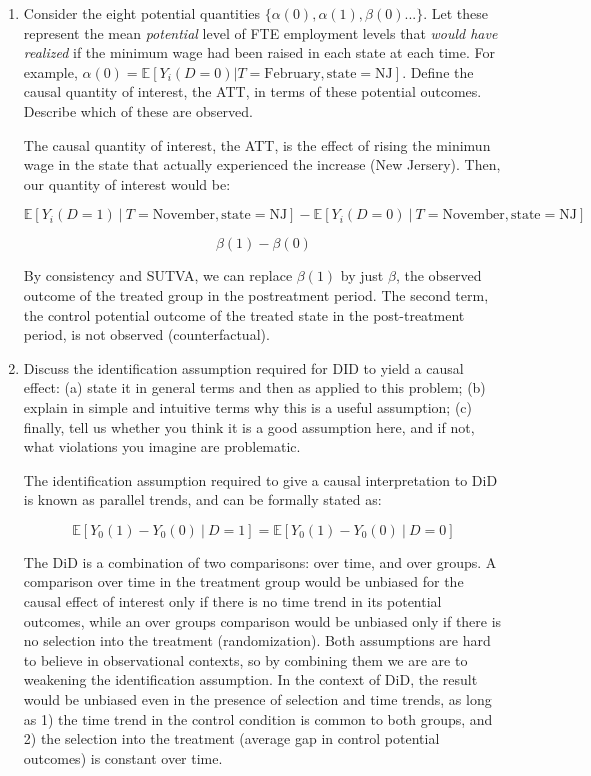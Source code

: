 \documentclass[
  12pt,
  letterpaper,
  DIV=11,
  numbers=noendperiod]{scrartcl}
\newcommand{\E}{\mathbb{E}}
\newcommand{\1}[1]{\mathds{1}\left[#1\right]}
\begin{document}
\begin{enumerate}
\begin{enumerate}
\item[(ii)]

Consider the eight potential quantities
\(\{\alpha(0), \alpha(1), \beta(0)...\}\). Let these represent the mean
\textit{potential} level of FTE employment levels that
\textit{would have realized} if the minimum wage had been raised in each
state at each time. For example,
\(\alpha(0) = \mathbb{E}[Y_i(D=0)|T=\text{February},\text{state}=\text{NJ}]\).
Define the causal quantity of interest, the ATT, in terms of these
potential outcomes. Describe which of these are observed.

The causal quantity of interest, the ATT, is the effect of rising the
minimun wage in the state that actually experienced the increase (New
Jersery). Then, our quantity of interest would be:

\[\E[Y_i(D=1)~|~T=\text{November}, \text{state}=\text{NJ}] - \E[Y_i(D=0)~|~T=\text{November}, \text{state}=\text{NJ}]\]

\[\beta(1) - \beta(0)\]

By consistency and SUTVA, we can replace \(\beta(1)\) by just \(\beta\),
the observed outcome of the treated group in the postreatment period.
The second term, the control potential outcome of the treated state in
the post-treatment period, is not observed (counterfactual).

\item[(iii)]

Discuss the identification assumption required for DID to yield a causal
effect: (a) state it in general terms and then as applied to this
problem; (b) explain in simple and intuitive terms why this is a useful
assumption; (c) finally, tell us whether you think it is a good
assumption here, and if not, what violations you imagine are
problematic.

The identification assumption required to give a causal interpretation
to DiD is known as parallel trends, and can be formally stated as:

\[\E[Y_0(1)-Y_0(0)~|~D=1] = \E[Y_0(1)-Y_0(0)~|~D=0]\]

The DiD is a combination of two comparisons: over time, and over groups.
A comparison over time in the treatment group would be unbiased for the
causal effect of interest only if there is no time trend in its
potential outcomes, while an over groups comparison would be unbiased
only if there is no selection into the treatment (randomization). Both
assumptions are hard to believe in observational contexts, so by
combining them we are are to weakening the identification assumption. In
the context of DiD, the result would be unbiased even in the presence of
selection and time trends, as long as 1) the time trend in the control
condition is common to both groups, and 2) the selection into the
treatment (average gap in control potential outcomes) is constant over
time.


\end{enumerate}
\end{enumerate}
\end{document}
